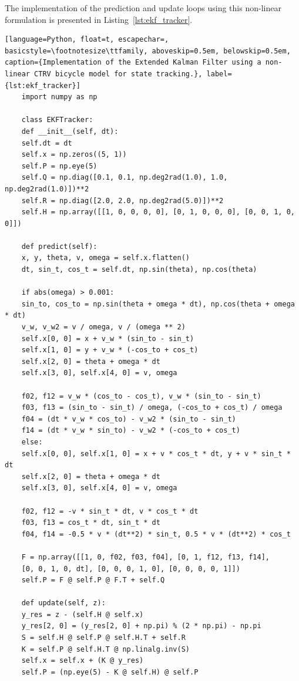 The implementation of the prediction and update loops using this non-linear formulation is presented in Listing~\ref{lst:ekf_tracker}.

\begin{lstlisting}[language=Python, float=t, escapechar=, basicstyle=\footnotesize\ttfamily, aboveskip=0.5em, belowskip=0.5em, caption={Implementation of the Extended Kalman Filter using a non-linear CTRV bicycle model for state tracking.}, label={lst:ekf_tracker}]
	import numpy as np
	
	class EKFTracker:
	def __init__(self, dt):
	self.dt = dt
	self.x = np.zeros((5, 1))
	self.P = np.eye(5) 
	self.Q = np.diag([0.1, 0.1, np.deg2rad(1.0), 1.0, np.deg2rad(1.0)])**2
	self.R = np.diag([2.0, 2.0, np.deg2rad(5.0)])**2 
	self.H = np.array([[1, 0, 0, 0, 0], [0, 1, 0, 0, 0], [0, 0, 1, 0, 0]])
	
	def predict(self):
	x, y, theta, v, omega = self.x.flatten()
	dt, sin_t, cos_t = self.dt, np.sin(theta), np.cos(theta)
	
	if abs(omega) > 0.001:
	sin_to, cos_to = np.sin(theta + omega * dt), np.cos(theta + omega * dt)
	v_w, v_w2 = v / omega, v / (omega ** 2)
	self.x[0, 0] = x + v_w * (sin_to - sin_t)
	self.x[1, 0] = y + v_w * (-cos_to + cos_t)
	self.x[2, 0] = theta + omega * dt
	self.x[3, 0], self.x[4, 0] = v, omega  
	
	f02, f12 = v_w * (cos_to - cos_t), v_w * (sin_to - sin_t)
	f03, f13 = (sin_to - sin_t) / omega, (-cos_to + cos_t) / omega
	f04 = (dt * v_w * cos_to) - v_w2 * (sin_to - sin_t)
	f14 = (dt * v_w * sin_to) - v_w2 * (-cos_to + cos_t)
	else:
	self.x[0, 0], self.x[1, 0] = x + v * cos_t * dt, y + v * sin_t * dt
	self.x[2, 0] = theta + omega * dt
	self.x[3, 0], self.x[4, 0] = v, omega  
	
	f02, f12 = -v * sin_t * dt, v * cos_t * dt
	f03, f13 = cos_t * dt, sin_t * dt
	f04, f14 = -0.5 * v * (dt**2) * sin_t, 0.5 * v * (dt**2) * cos_t
	
	F = np.array([[1, 0, f02, f03, f04], [0, 1, f12, f13, f14],
	[0, 0, 1, 0, dt], [0, 0, 0, 1, 0], [0, 0, 0, 0, 1]])
	self.P = F @ self.P @ F.T + self.Q
	
	def update(self, z):
	y_res = z - (self.H @ self.x)
	y_res[2, 0] = (y_res[2, 0] + np.pi) % (2 * np.pi) - np.pi
	S = self.H @ self.P @ self.H.T + self.R
	K = self.P @ self.H.T @ np.linalg.inv(S)
	self.x = self.x + (K @ y_res)
	self.P = (np.eye(5) - K @ self.H) @ self.P
\end{lstlisting}




